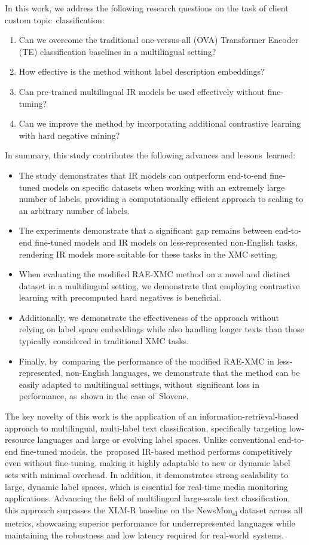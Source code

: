 \documentclass[make,article,accept,pdftex,moreauthors]{Definitions/mdpi}
\begin{document}
In this work, we address the following research questions on the task of client custom topic~classification:
\begin{enumerate}
    \item[RQ1] Can we overcome the traditional one-versus-all (OVA) Transformer Encoder (TE) classification baselines in a multilingual setting?
    \item[RQ2] How effective is the method without label description embeddings?
    \item[RQ3] Can pre-trained multilingual IR models be used effectively without fine-tuning?
    \item[RQ4] Can we improve the method by incorporating additional contrastive learning with hard negative mining?
\end{enumerate}

In summary, this study contributes the following advances and lessons~learned: 
\begin{itemize}
\item The study demonstrates that IR models can outperform end-to-end fine-tuned models on specific datasets when working with an extremely large number of labels, providing a computationally efficient approach to scaling to an arbitrary number of labels.
\item The experiments demonstrate that a significant gap remains between end-to-end fine-tuned models and IR models on less-represented non-English tasks, rendering IR models more suitable for these tasks in the XMC setting.
\item When evaluating the modified RAE-XMC method on a novel and distinct dataset in a multilingual setting, we demonstrate that employing contrastive learning with precomputed hard negatives is beneficial.
\item Additionally, we demonstrate the effectiveness of the approach without relying on label space embeddings while also handling longer texts than those typically considered in traditional XMC tasks. 
\item Finally, by~comparing the performance of the modified RAE-XMC in less-represented, non-English languages, we demonstrate that the method can be easily adapted to multilingual settings, without~significant loss in performance, as~shown in the case \mbox{of Slovene. }
\end{itemize}

The key novelty of this work is the application of an information-retrieval-based approach to multilingual, multi-label text classification, specifically targeting low-resource languages and large or evolving label spaces.
Unlike conventional end-to-end fine-tuned models, the~proposed IR-based method performs competitively even without fine-tuning, making it highly adaptable to new or dynamic label sets with minimal overhead. 
In addition, it demonstrates strong scalability to large, dynamic label spaces, which is essential for real-time media monitoring applications. 
Advancing the field of multilingual large-scale text classification, this approach surpasses the XLM-R baseline on the NewsMon\textsubscript{sl} dataset across all metrics, showcasing superior performance for underrepresented languages while maintaining the robustness and low latency required for real-world~systems.
\end{document}
